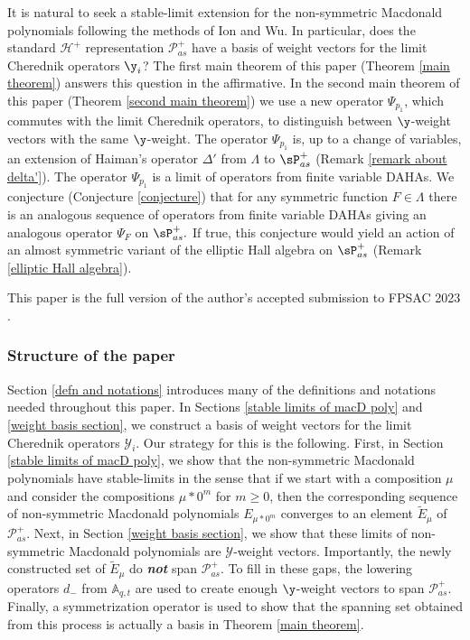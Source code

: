 It is natural to seek a stable-limit extension for the non-symmetric Macdonald polynomials following the methods of Ion and Wu. In particular, does the standard $\mathscr{H}^{+}$ representation $\mathscr{P}_{as}^{+}$ have a basis of weight vectors for the limit Cherednik operators $\y_i$? The first main theorem of this paper (Theorem \ref{main theorem}) answers this question in the affirmative. In the second main theorem of this paper (Theorem \ref{second main theorem}) we use a new operator $\Psi_{p_1}$, which commutes with the limit Cherednik operators, to distinguish between $\y$-weight vectors with the same $\y$-weight. The operator $\Psi_{p_1}$ is, up to a change of variables, an extension of Haiman's operator $\Delta'$ \cite{HMacDG} from $\Lambda$ to $\sP_{as}^{+}$ (Remark \ref{remark about delta'}). The operator $\Psi_{p_1}$ is a limit of operators from finite variable DAHAs. We conjecture (Conjecture \ref{conjecture}) that for any symmetric function $F \in \Lambda$ there is an analogous sequence of operators from finite variable DAHAs giving an analogous operator $\Psi_{F}$ on $\sP_{as}^{+}.$ If true, this conjecture would yield an action of an almost symmetric variant of the elliptic Hall algebra \cite{BS, SV} on $\sP_{as}^{+}$ (Remark \ref{elliptic Hall algebra}).

\begin{rema}
This paper is the full version of the author's accepted submission to FPSAC 2023 \cite{MBW}.
\end{rema}

\subsubsection*{Structure of the paper}
Section \ref{defn and notations} introduces many of the definitions and notations needed throughout this paper. In Sections \ref{stable limits of macD poly} and \ref{weight basis section},
we construct a basis of weight vectors for the limit Cherednik operators $\mathscr{Y}_i$.
Our strategy for this is the following. First, in Section \ref{stable limits of macD poly}, we show that the non-symmetric Macdonald polynomials have stable-limits in the sense that if we start with a composition $\mu$ and consider the compositions $\mu * 0^m$ for $m \geq 0$, then the corresponding sequence of non-symmetric Macdonald polynomials $E_{\mu * 0^m}$ converges to an element $\widetilde{E}_{\mu}$ of $\mathscr{P}_{as}^{+}$. Next, in Section \ref{weight basis section}, we show that these limits of non-symmetric Macdonald polynomials are $\mathscr{Y}$-weight vectors. Importantly, the newly constructed set of $\widetilde{E}_{\mu}$ do \textbf{\textit{not}} span $\mathscr{P}_{as}^{+}$. To fill in these gaps, the lowering operators $d_{-}$ from $\mathbb{A}_{q,t}$ are used to create enough $\y$-weight vectors to span $\mathscr{P}_{as}^{+}$. Finally, a symmetrization operator is used to show that the spanning set obtained from this process is actually a basis in Theorem \ref{main theorem}.

